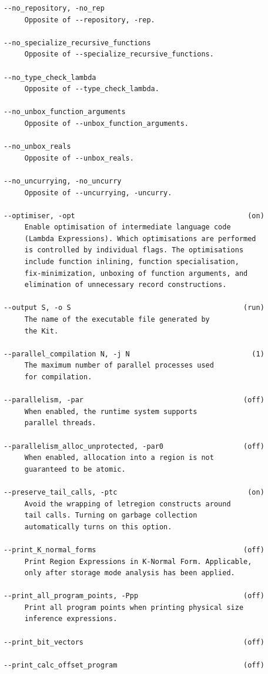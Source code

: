 \documentclass[12pt]{book}
\begin{document}
\begin{verbatim}
--no_repository, -no_rep
     Opposite of --repository, -rep.

--no_specialize_recursive_functions
     Opposite of --specialize_recursive_functions.

--no_type_check_lambda
     Opposite of --type_check_lambda.

--no_unbox_function_arguments
     Opposite of --unbox_function_arguments.

--no_unbox_reals
     Opposite of --unbox_reals.

--no_uncurrying, -no_uncurry
     Opposite of --uncurrying, -uncurry.

--optimiser, -opt                                         (on)
     Enable optimisation of intermediate language code
     (Lambda Expressions). Which optimisations are performed
     is controlled by individual flags. The optimisations
     include function inlining, function specialisation,
     fix-minimization, unboxing of function arguments, and
     elimination of unnecessary record constructions.

--output S, -o S                                         (run)
     The name of the executable file generated by
     the Kit.

--parallel_compilation N, -j N                             (1)
     The maximum number of parallel processes used
     for compilation.

--parallelism, -par                                      (off)
     When enabled, the runtime system supports
     parallel threads.

--parallelism_alloc_unprotected, -par0                   (off)
     When enabled, allocation into a region is not
     guaranteed to be atomic.

--preserve_tail_calls, -ptc                               (on)
     Avoid the wrapping of letregion constructs around
     tail calls. Turning on garbage collection
     automatically turns on this option.

--print_K_normal_forms                                   (off)
     Print Region Expressions in K-Normal Form. Applicable,
     only after storage mode analysis has been applied.

--print_all_program_points, -Ppp                         (off)
     Print all program points when printing physical size
     inference expressions.

--print_bit_vectors                                      (off)

--print_calc_offset_program                              (off)


\end{verbatim}
\end{document}
